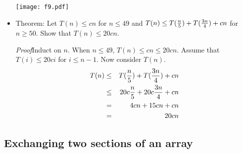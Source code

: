 \documentclass{article}
\begin{document}
\begin{itemize}
\vskip 0.25cm
\begin{center}
\texttt{[image: f9.pdf]}
\end{center}

\item Theorem: Let $T(n)\le cn$ for $n\le 49$ and $T(n)\le
T({n\over5})+T({3n\over4})+cn$ for $n\ge 50$. Show that
$T(n)\le 20cn$.

{\em Proof}\quad Induct on $n$. When $n\le 49$,
$T(n)\le cn\le 20cn$. Assume that $T(i)\le 20ci$ for $i\le n-1$.
Now consider $T(n)$.
\begin{eqnarray*}
T(n)&\le&T({n\over5})+T({3n\over4})+cn\\
&\le&20c{n\over5}+20c{3n\over4}+cn\\
&=&4cn+15cn+cn\\
&=&20cn
\end{eqnarray*}

\end{itemize}

\subsection{Exchanging two sections of an array}
\end{document}
